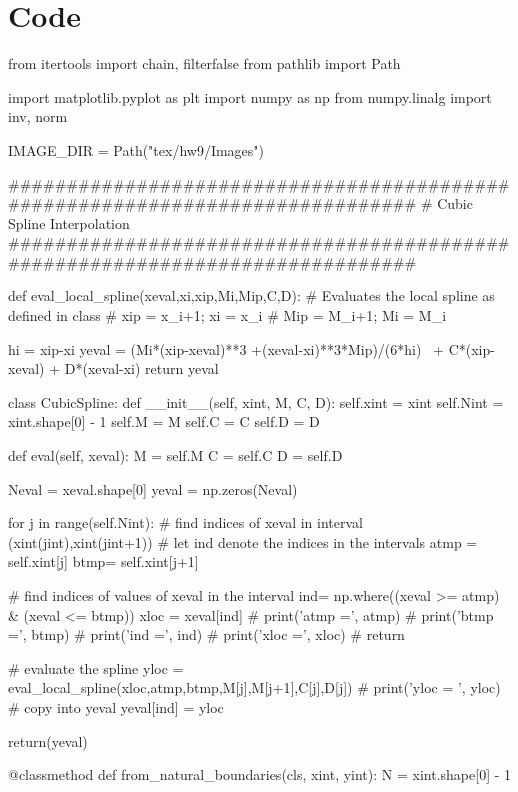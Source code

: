 \documentclass{homework}
\begin{document}
\section{Code}
\begin{python}
from itertools import chain, filterfalse
from pathlib import Path

import matplotlib.pyplot as plt
import numpy as np
from numpy.linalg import inv, norm

IMAGE_DIR = Path("tex/hw9/Images")

##############################################################################
# Cubic Spline Interpolation
##############################################################################


def eval_local_spline(xeval,xi,xip,Mi,Mip,C,D):
    # Evaluates the local spline as defined in class
    # xip = x_{i+1}; xi = x_i
    # Mip = M_{i+1}; Mi = M_i

    hi = xip-xi
    yeval = (Mi*(xip-xeval)**3 +(xeval-xi)**3*Mip)/(6*hi) \
            + C*(xip-xeval) + D*(xeval-xi)
    return yeval


class CubicSpline:
    def __init__(self, xint, M, C, D):
        self.xint = xint
        self.Nint = xint.shape[0] - 1
        self.M = M
        self.C = C
        self.D = D

    def eval(self, xeval):
        M = self.M
        C = self.C
        D = self.D

        Neval = xeval.shape[0]
        yeval = np.zeros(Neval)

        for j in range(self.Nint):
            # find indices of xeval in interval (xint(jint),xint(jint+1))
            # let ind denote the indices in the intervals
            atmp = self.xint[j]
            btmp= self.xint[j+1]

            #   find indices of values of xeval in the interval
            ind= np.where((xeval >= atmp) & (xeval <= btmp))
            xloc = xeval[ind]
            #  print('atmp =', atmp)
            #  print('btmp =', btmp)
            #  print('ind =', ind)
            #  print('xloc =', xloc)
            #  return

            # evaluate the spline
            yloc = eval_local_spline(xloc,atmp,btmp,M[j],M[j+1],C[j],D[j])
            # print('yloc = ', yloc)
            # copy into yeval
            yeval[ind] = yloc

        return(yeval)

    @classmethod
    def from_natural_boundaries(cls, xint, yint):
        N = xint.shape[0] - 1


\end{python}
\end{document}
